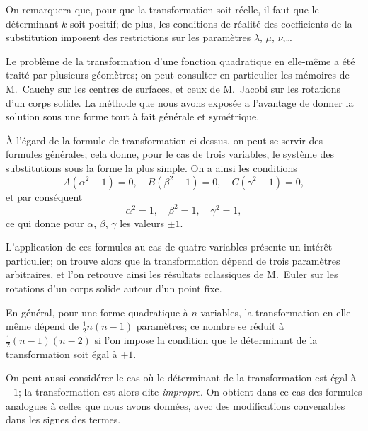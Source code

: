 \documentclass[11pt,a4paper]{book}
\begin{document}
\medskip

On remarquera que, pour que la transformation soit r\'eelle, il faut que
le d\'eterminant $k$ soit positif; de plus, les conditions de r\'ealit\'e
des coefficients de la substitution imposent des restrictions sur les
param\`etres $\lambda$, $\mu$, $\nu$,\ldots

\medskip

Le probl\`eme de la transformation d'une fonction quadratique en
elle-m\^eme a \'et\'e trait\'e par plusieurs g\'eom\`etres; on peut consulter
en particulier les m\'emoires de M.~Cauchy sur les centres de surfaces, et
ceux de M.~Jacobi sur les rotations d'un corps solide. La m\'ethode que
nous avons expos\'ee a l'avantage de donner la solution sous une forme
tout \`a fait g\'en\'erale et sym\'etrique.

\medskip

\`A l'\'egard de la formule de transformation ci-dessus, on peut se servir
des formules g\'en\'erales; cela donne, pour le cas de trois variables,
le syst\`eme des substitutions sous la forme la plus simple. On a ainsi
les conditions
\[
A(\alpha^2-1) = 0,\quad B(\beta^2-1) = 0,\quad C(\gamma^2-1) = 0,
\]
et par cons\'equent
\[
\alpha^2 = 1,\quad \beta^2 = 1,\quad \gamma^2 = 1,
\]
ce qui donne pour $\alpha$, $\beta$, $\gamma$ les valeurs $\pm 1$.

\medskip

L'application de ces formules au cas de quatre variables pr\'esente un
int\'er\^et particulier; on trouve alors que la transformation d\'epend de
trois param\`etres arbitraires, et l'on retrouve ainsi les r\'esultats
cclassiques de M.~Euler sur les rotations d'un corps solide autour d'un
point fixe.

\medskip

En g\'en\'eral, pour une forme quadratique \`a $n$ variables, la
transformation en elle-m\^eme d\'epend de $\tfrac{1}{2}n(n-1)$ param\`etres;
ce nombre se r\'eduit \`a $\tfrac{1}{2}(n-1)(n-2)$ si l'on impose la
condition que le d\'eterminant de la transformation soit \'egal \`a $+1$.

\medskip

On peut aussi consid\'erer le cas o\`u le d\'eterminant de la transformation
est \'egal \`a $-1$; la transformation est alors dite \textit{impropre}.
On obtient dans ce cas des formules analogues \`a celles que nous avons
donn\'ees, avec des modifications convenables dans les signes des termes.

\newpage
\end{document}
